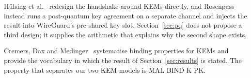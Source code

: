  Hülsing et
al.~\cite{hulsing2021pqwireguard} redesign the handshake around KEMs directly,
and Rosenpass~\cite{rosenpass2023} instead runs a post-quantum key agreement
on a separate channel and injects the result into WireGuard's pre-shared key
slot. Section~\ref{sec:pq} does not propose a third design; it supplies the
arithmetic that explains why the second shape exists.

 Cremers, Dax and Medinger~\cite{cremers2024kembinding}
systematise binding properties for KEMs and provide the vocabulary in which
the result of Section~\ref{sec:results} is stated. The property that separates
our two KEM models is MAL-BIND-K-PK.

